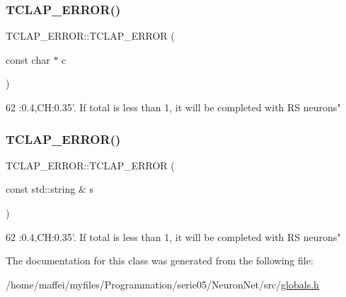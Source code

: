 \subsubsection{\texorpdfstring{T\+C\+L\+A\+P\+\_\+\+E\+R\+R\+O\+R()}{TCLAP\_ERROR()}\hspace{0.1cm}{\footnotesize\ttfamily [1/2]}}
{\footnotesize\ttfamily T\+C\+L\+A\+P\+\_\+\+E\+R\+R\+O\+R\+::\+T\+C\+L\+A\+P\+\_\+\+E\+R\+R\+OR (\begin{DoxyParamCaption}\item[{const char $\ast$}]{c }\end{DoxyParamCaption})\hspace{0.3cm}{\ttfamily [inline]}}


\begin{DoxyCode}
62 :0.4,CH:0.35\textcolor{stringliteral}{'. If total is less than 1, it will be completed with RS neurons"}
\end{DoxyCode}
\mbox{\label{classTCLAP__ERROR_a8df7cf40b000475e793bb76517256db3}} 
\subsubsection{\texorpdfstring{T\+C\+L\+A\+P\+\_\+\+E\+R\+R\+O\+R()}{TCLAP\_ERROR()}\hspace{0.1cm}{\footnotesize\ttfamily [2/2]}}
{\footnotesize\ttfamily T\+C\+L\+A\+P\+\_\+\+E\+R\+R\+O\+R\+::\+T\+C\+L\+A\+P\+\_\+\+E\+R\+R\+OR (\begin{DoxyParamCaption}\item[{const std\+::string \&}]{s }\end{DoxyParamCaption})\hspace{0.3cm}{\ttfamily [inline]}}


\begin{DoxyCode}
62 :0.4,CH:0.35\textcolor{stringliteral}{'. If total is less than 1, it will be completed with RS neurons"}
\end{DoxyCode}


The documentation for this class was generated from the following file\+:\begin{DoxyCompactItemize}
\item 
/home/maffei/myfiles/\+Programmation/serie05/\+Neuron\+Net/src/\hyperlink{globals_8h}{globals.\+h}\end{DoxyCompactItemize}
